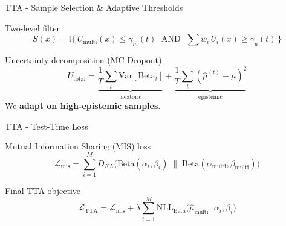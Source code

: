 \documentclass[aspectratio=169]{beamer}
\newcommand{\hl}[1]{\textcolor{coolpurple}{\textbf{#1}}}
\begin{document}
	\begin{frame}{TTA - Sample Selection \& Adaptive Thresholds}
		\begin{block}{Two-level filter}
			\centering\small
			\vspace{0.2em}
			$$ S(x) = \mathbb{I}\bigl\{\,U_{\text{multi}}(x) \leq \gamma_m(t) \;\text{ AND }\; \textstyle\sum w_i\, U_i(x) \geq \gamma_u(t)\,\bigr\} $$
			\vspace{0.2em}
		\end{block}
		
		\vspace{1em}
		\begin{block}{Uncertainty decomposition (MC Dropout)}
			\footnotesize
			$$ U_{\text{total}} = \underbrace{\frac{1}{T}\sum_t\mathrm{Var}[\text{Beta}_t]}_{\text{aleatoric}} + \underbrace{\frac{1}{T}\sum_t(\hat{\mu}^{(t)}-\bar{\mu})^2}_{\text{epistemic}} $$
			We \hl{adapt on high-epistemic samples}.
		\end{block}
	\end{frame}
	
	\begin{frame}{TTA - Test-Time Loss}
		\begin{block}{Mutual Information Sharing (MIS) loss}
			\footnotesize
			$$ \mathcal{L}_{\text{mis}} = \sum_{i=1}^M D_{KL}\!\bigl(\text{Beta}(\alpha_i,\beta_i)\;\|\;\text{Beta}(\alpha_{\text{multi}},\beta_{\text{multi}})\bigr) $$
			\begin{center}
			\end{center}
		\end{block}
		\begin{block}{Final TTA objective}
			\centering\small
			$$ \mathcal{L}_{\text{TTA}} = \mathcal{L}_{\text{mis}} + \lambda\displaystyle\sum_{i=1}^M \text{NLL}_{\text{Beta}}\!\bigl(\hat{\mu}_{\text{multi}},\,\alpha_i,\beta_i\bigr) $$
		\end{block}
	\end{frame}
	
\end{document}
